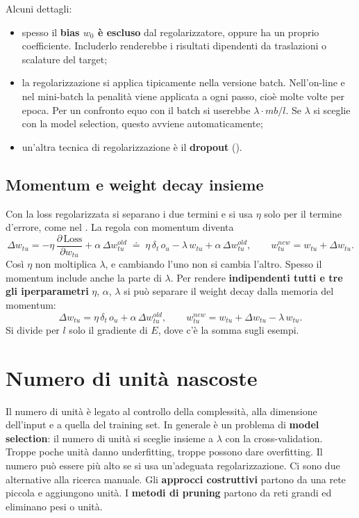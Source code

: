 Alcuni dettagli:
\begin{itemize}
  \item spesso il \textbf{bias $w_0$ è escluso} dal regolarizzatore, oppure ha un proprio coefficiente.
        Includerlo renderebbe i risultati dipendenti da traslazioni o scalature del target;
  \item la regolarizzazione si applica tipicamente nella versione batch. Nell'on-line e nel mini-batch la
        penalità viene applicata a ogni passo, cioè molte volte per epoca. Per un confronto equo con il batch si
        userebbe $\lambda\cdot mb/l$. Se $\lambda$ si sceglie con la model selection, questo avviene
        automaticamente;
  \item un'altra tecnica di regolarizzazione è il \textbf{dropout} ().
\end{itemize}

\subsection{Momentum e weight decay insieme}

Con la loss regolarizzata si separano i due termini e si usa $\eta$ solo per il termine d'errore, come nel
. La regola con momentum diventa
\[
\Delta w_{tu} = -\eta\,\frac{\partial\,\mathrm{Loss}}{\partial w_{tu}} + \alpha\,\Delta w_{tu}^{\mathit{old}}
\;\doteq\; \eta\,\delta_t\,o_u - \lambda\,w_{tu} + \alpha\,\Delta w_{tu}^{\mathit{old}},\qquad
w_{tu}^{\mathit{new}} = w_{tu} + \Delta w_{tu}.
\]
Così $\eta$ non moltiplica $\lambda$, e cambiando l'uno non si cambia l'altro. Spesso il momentum include anche la
parte di $\lambda$. Per rendere \textbf{indipendenti tutti e tre gli iperparametri} $\eta$, $\alpha$, $\lambda$ si
può separare il weight decay dalla memoria del momentum:
\[
\Delta w_{tu} = \eta\,\delta_t\,o_u + \alpha\,\Delta w_{tu}^{\mathit{old}},\qquad
w_{tu}^{\mathit{new}} = w_{tu} + \Delta w_{tu} - \lambda\,w_{tu}.
\]
Si divide per $l$ solo il gradiente di $E$, dove c'è la somma sugli esempi.

\section{Numero di unità nascoste}
\label{sec:unita-nascoste}

Il numero di unità è legato al controllo della complessità, alla dimensione dell'input e a quella del training
set. In generale è un problema di \textbf{model selection}: il numero di unità si sceglie insieme a $\lambda$ con
la cross-validation. Troppe poche unità danno underfitting, troppe possono dare overfitting. Il numero può essere
più alto se si usa un'adeguata regolarizzazione. Ci sono due alternative alla ricerca manuale. Gli \textbf{approcci
costruttivi} partono da una rete piccola e aggiungono unità. I \textbf{metodi di pruning} partono da reti grandi ed
eliminano pesi o unità.

